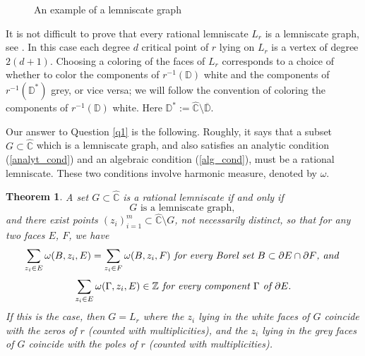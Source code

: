 \documentclass{amsart}
\theoremstyle{plain}
\newtheorem{theorem}{Theorem}[section]
\theoremstyle{definition}
\theoremstyle{remark}
\newcommand{\mD}{\mathbb{D}}
\newcommand{\hC}{\widehat{\mathbb{C}}}
\begin{document}
\begin{figure}
    \caption{An example of a lemniscate graph}
    \label{fig:lemGraph}
\end{figure}

It is not difficult to prove that every rational lemniscate $L_r$ is a lemniscate graph, see \cite[Proposition 2.4]{BishopEremenkoLazebnik2025}. In this case each degree $d$ critical point of $r$ lying on $L_r$ is a vertex of degree $2(d+1)$. Choosing a coloring of the faces of $L_r$ corresponds to a choice of whether to color the components of $r^{-1}(\mathbb{D})$ white and the components of $r^{-1}(\mD^*)$ grey, or vice versa; we will follow the convention of coloring the components of $r^{-1}(\mathbb{D})$ white. Here $\mD^*:=\hC \setminus \overline{\mD}$.

Our answer to Question \ref{q1} is the following. Roughly, it says that a subset $G \subset \hC$ which is a lemniscate graph, and also satisfies an analytic condition (\ref{analyt_cond}) and an algebraic condition (\ref{alg_cond}), must be a rational lemniscate. These two conditions involve harmonic measure, denoted by $\omega$.

\begin{theorem}
\label{answerq1}
A set $G \subset \hC$ is a rational lemniscate if and only if
\begin{equation}\label{top_cond} G \textrm{ is a lemniscate graph, }
\end{equation}
and there exist points $(z_i)_{i=1}^m \subset \hC \setminus G$, not necessarily distinct, so that for any two faces $E$, $F$, we have
\begin{equation}\label{analyt_cond} \sum_{z_i \in E} \omega(B, z_i, E) = \sum_{z_i \in F} \omega(B, z_i, F) \emph{ for every Borel set } B\subset \partial E\cap \partial F\emph{, and }
\end{equation}
\begin{equation}\label{alg_cond} \sum_{z_i \in E} \omega(\Gamma, z_i, E) \in \mathbb{Z} \emph{ for every component } \Gamma \emph{ of } \partial E.
\end{equation}
If this is the case, then $G=L_r$ where the $z_i$ lying in the white faces of $G$ coincide with the zeros of $r$ (counted with multiplicities), and the $z_i$ lying in the grey faces of $G$ coincide with the poles of $r$  (counted with multiplicities).
\end{theorem}
\end{document}
